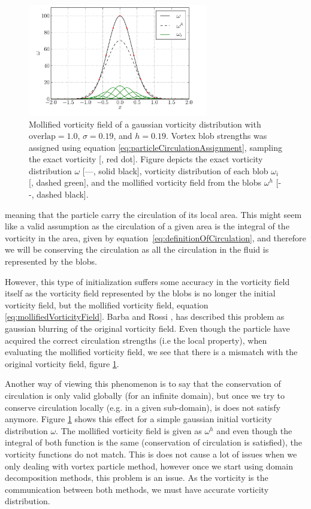 	\begin{figure}[!b]
	\centering
	\includegraphics[width=0.7\textwidth]{figures/lagrangian/particleInitialization.pdf}
	\caption{Mollified vorticity field of a gaussian vorticity distribution with $\mathrm{overlap}=1.0$, $\sigma=0.19$, and $h=0.19$. Vortex blob strengths was assigned using equation \ref{eq:particleCirculationAssignment}, sampling the exact vorticity [{\color{plotRed}{$\bullet$}}, red dot]. Figure depicts the exact vorticity distribution $\omega$ [---, solid black], vorticity distribution of each blob $\omega_i$ [{\color{darkgreen}{---}}, dashed green], and the mollified vorticity field from the blobs $\omega^h$ [- -, dashed black].  }
	\label{fig:particleInitialization}
	\end{figure}

meaning that the particle carry the circulation of its local area. This might seem like a valid assumption as the circulation of a given area is the integral of the vorticity in the area, given by equation\ \ref{eq:definitionOfCirculation}, and therefore we will be conserving the circulation as all the circulation in the fluid is represented by the blobs.

However, this type of initialization suffers some accuracy in the vorticity field itself as the vorticity field represented by the blobs is no longer the initial vorticity field, but the mollified vorticity field, equation \ref{eq:mollifiedVorticityField}. Barba and Rossi \cite{Barba2010a}, has described this problem as gaussian blurring of the original vorticity field. Even though the particle have acquired the correct circulation strengths (i.e the local property), when evaluating the mollified vorticity field, we see that there is a mismatch with the original vorticity field, figure \ref{fig:particleInitialization}. 

Another way of viewing this phenomenon is to say that the conservation of circulation is only valid globally (for an infinite domain), but once we try to conserve circulation locally (e.g. in a given sub-domain), is does not satisfy anymore. Figure \ref{fig:particleInitialization} shows this effect for a simple gaussian initial vorticity distribution $\omega$. The mollified vorticity field is given as $\omega^h$ and even though the integral of both function is the same (conservation of circulation is satisfied), the vorticity functions do not match. This is does not cause a lot of issues when we only dealing with vortex particle method, however once we start using domain decomposition methods, this problem is an issue. As the vorticity is the communication between both methods, we must have accurate vorticity distribution.

